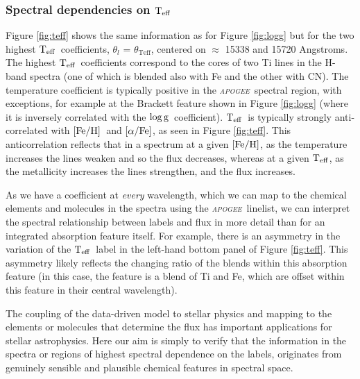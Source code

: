 \documentclass[12pt, preprint]{aastex}
\newcommand{\project}[1]{\textsl{#1}}
\newcommand{\apogee}{\project{\textsc{apogee}}}
\newcommand{\teff}{\mbox{$\rm T_{eff}$}}
\newcommand{\feh}{\mbox{$\rm [Fe/H]$}}
\newcommand{\alphafe}{\mbox{$\rm [\alpha/Fe]$}}
\newcommand{\logg}{\mbox{$\rm \log g$}}
\begin{document}
\subsubsection{Spectral dependencies on \teff} 

Figure \ref{fig:teff} shows the same information as for Figure \ref{fig:logg} but for the two highest \teff\ coefficients, $\theta_l$ = $\theta_{\mbox{Teff}}$, centered on $\approx$ 15338 and 15720 Angstroms. The highest \teff\ coefficients correspond to the cores of two Ti lines in the H-band spectra (one of which is blended also with Fe and the other with CN). The temperature coefficient is typically positive in the \apogee\ spectral region, with exceptions, for example at the Brackett feature shown in Figure \ref{fig:logg} (where it is inversely correlated with the \logg\ coefficient). \teff\ is typically strongly anti-correlated with \feh\ and \alphafe, as seen in Figure \ref{fig:teff}. This anticorrelation reflects that in a spectrum at a given \feh, as the temperature increases the lines weaken and so the flux decreases, whereas at a given \teff, as the metallicity increases the lines strengthen, and the flux increases. 

As we have a coefficient at \textit{every} wavelength, which we can map to the chemical elements and molecules in the spectra using the \apogee\ linelist, we can interpret the spectral relationship between labels and flux in more detail than for an integrated absorption feature itself.  For example, there is an asymmetry in the variation of the \teff\ label in the left-hand bottom panel of Figure \ref{fig:teff}. This asymmetry likely reflects the changing ratio of the blends within this absorption feature (in this case, the feature is a blend of Ti and Fe, which are offset within this feature in their central wavelength).

The coupling of the data-driven model to stellar physics and mapping to the elements or molecules that determine the flux has important applications for stellar astrophysics. Here our aim is simply to verify that the information in the spectra or regions of highest spectral dependence on the labels, originates from genuinely sensible and plausible chemical features in spectral space.  
\end{document}
